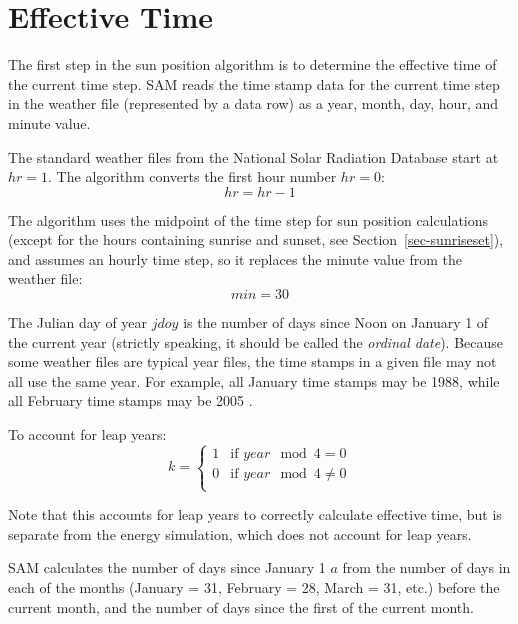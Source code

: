 \documentclass[12pt,letterpaper]{article}
\begin{document}
\section{Effective Time}

The first step in the sun position algorithm is to determine the effective time of the current time step. SAM reads the time stamp data for the current time step in the weather file (represented by a data row) as a year, month, day, hour, and minute value. %

The standard weather files from the National Solar Radiation Database \citep{nsrdb} start at $hr=1$. The algorithm converts the first hour number $hr=0$: 
\begin{equation}
hr=hr-1
\end{equation}

The algorithm uses the midpoint of the time step for sun position calculations (except for the hours containing sunrise and sunset, see Section~\ref{sec-sunriseset}), and assumes an hourly time step, so it replaces the minute value from the weather file: %
\begin{equation}\label{eqn-mn30}
\mathit{min} =30
\end{equation}

The Julian day of year $\mathit{jdoy}$ is the number of days since Noon on January 1 of the current year (strictly speaking, it should be called the \textit{ordinal date}). Because some weather files are typical year files, the time stamps in a given file may not all use the same year. For example, all January time stamps may be 1988, while all February time stamps may be 2005 \citep{tmy3}.

To account for leap years:
\begin{equation}
k = 
\left\{
   \begin{array}{ll}
      1 & \text{if $\mathit{year}\mod4=0$}\\
      0 & \text{if $\mathit{year}\mod4\neq0$}\\
   \end{array}
\right. 
\end{equation}

Note that this accounts for leap years to correctly calculate effective time, but is separate from the energy simulation, which does not account for leap years.

SAM calculates the number of days since January 1 $a$ from the number of days in each of the months (January = 31, February = 28, March = 31, etc.) before the current month, and the number of days since the first of the current month.
\end{document}

